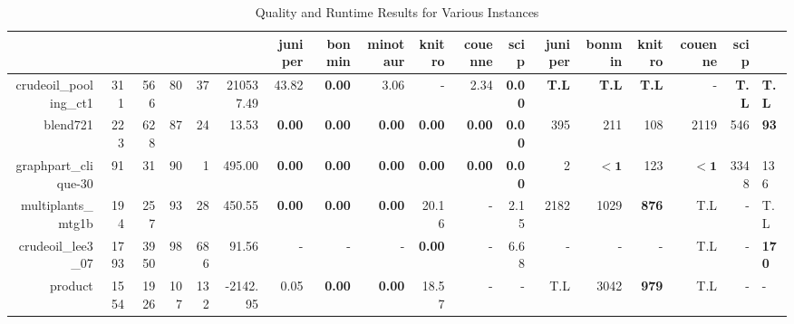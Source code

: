 \begin{table*}[t] 
\footnotesize 
\caption{Quality and Runtime Results for Various Instances} 
\begin{tabular}{|r|r|r|r|r||r||r|r|r|r|r||r|r|r|r|r|r|} 
\hline 
  & juniper    & bonmin  & minotaur & knitro & couenne        & scip            & juniper          & bonmin  & knitro  & couenne         & scip \\  
    \hline 
    \hline 
            crudeoil\_pooling\_ct1 &          311 &           566 &           80 &            37 &           210537.49 &          43.82 &  \textbf{0.00} &           3.06 &              - &           2.34 &  \textbf{0.00} &       \textbf{T.L} &       \textbf{T.L} &       \textbf{T.L} &                  - & \textbf{T.L} & \textbf{T.L} \\ 
                          blend721 &          223 &           628 &           87 &            24 &               13.53 &  \textbf{0.00} &  \textbf{0.00} &  \textbf{0.00} &  \textbf{0.00} &  \textbf{0.00} &  \textbf{0.00} &                395 &                211 &                108 &               2119 &          546 &  \textbf{93} \\ 
              graphpart\_clique-30 &           91 &            31 &           90 &             1 &              495.00 &  \textbf{0.00} &  \textbf{0.00} &  \textbf{0.00} &  \textbf{0.00} &  \textbf{0.00} &  \textbf{0.00} &                  2 &         $\bm{< 1}$ &                123 &         $\bm{< 1}$ &         3348 &          136 \\ 
                multiplants\_mtg1b &          194 &           257 &           93 &            28 &              450.55 &  \textbf{0.00} &  \textbf{0.00} &  \textbf{0.00} &          20.16 &              - &           2.15 &               2182 &               1029 &       \textbf{876} &                T.L &            - &          T.L \\ 
                crudeoil\_lee3\_07 &         1793 &          3950 &           98 &           686 &               91.56 &              - &              - &              - &  \textbf{0.00} &              - &           6.68 &                  - &                  - &                  - &                T.L &            - & \textbf{170} \\ 
                           product &         1554 &          1926 &          107 &           132 &            -2142.95 &           0.05 &  \textbf{0.00} &  \textbf{0.00} &          18.57 &              - &              - &                T.L &               3042 &       \textbf{979} &                T.L &            - &            - \\ 

\end{tabular}
\end{table*}
